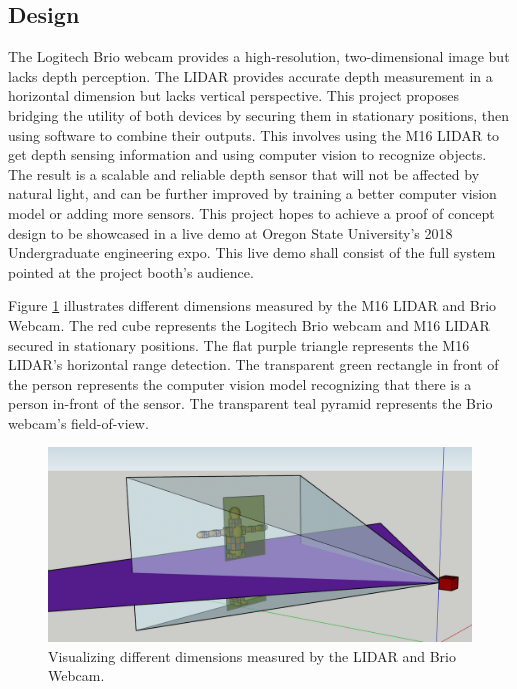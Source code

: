 \documentclass[onecolumn, draftclsnofoot,10pt, compsoc]{IEEEtran}
\makeatletter
\newcommand\captionof[1]{\def\@captype{#1}\caption}
\makeatother
\begin{document}
\begin{singlespace}
	\section{Design}
		The Logitech Brio webcam provides a high-resolution, two-dimensional image but lacks depth perception.
		The LIDAR provides accurate depth measurement in a horizontal dimension but lacks vertical perspective.
		This project proposes bridging the utility of both devices by securing them in stationary positions, then using software to combine their outputs.
		This involves using the M16 LIDAR to get depth sensing information and using computer vision to recognize objects.
		The result is a scalable and reliable depth sensor that will not be affected by natural light, and can be further improved by training a better computer vision model or adding more sensors.
		This project hopes to achieve a proof of concept design to be showcased in a live demo at Oregon State University's 2018 Undergraduate engineering expo.			
		This live demo shall consist of the full system pointed at the project booth's audience. 

		Figure \ref{dimensions} illustrates different dimensions measured by the M16 LIDAR and Brio Webcam.
		The red cube represents the Logitech Brio webcam and M16 LIDAR secured in stationary positions.
		The flat purple triangle represents the M16 LIDAR's horizontal range detection.
		The transparent green rectangle in front of the person represents the computer vision model recognizing that there is a person in-front of the sensor.
		The transparent teal pyramid represents the Brio webcam's field-of-view.
		
		\begin{figure}[H]
			\includegraphics[scale=0.5]{different_dimensions.PNG}
			\captionof{figure}{Visualizing different dimensions measured by the LIDAR and Brio Webcam.}
			\label{dimensions}
		\end{figure}


\end{singlespace}
\end{document}
